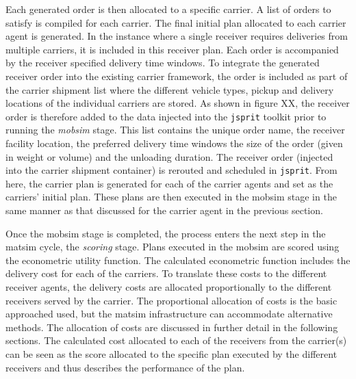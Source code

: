 Each generated order is then allocated to a specific carrier. A list of orders to satisfy is compiled for each carrier. The final initial plan allocated to each carrier agent is generated. In the instance where a single receiver requires deliveries from multiple carriers, it is included in this receiver plan. Each order is accompanied by the receiver specified delivery time windows. To integrate the generated receiver order into the existing carrier framework, the order is included as part of the carrier shipment list where the different vehicle types, pickup and delivery locations of the individual carriers are stored. As shown in figure XX, the receiver order is therefore added to the data injected into the \texttt{jsprit} toolkit prior to running the \textit{mobsim} stage. This list contains the unique order name, the receiver facility location, the preferred delivery time windows the size of the order (given in weight or volume) and the unloading duration. The receiver order (injected into the carrier shipment container) is rerouted and scheduled in \texttt{jsprit}. From here, the carrier plan is generated for each of the carrier agents and set as the carriers' initial plan. These plans are then executed in the mobsim stage in the same manner as that discussed for the carrier agent in the previous section. \par

Once the mobsim stage is completed, the process enters the next step in the \acrshort{matsim} cycle, the \textit{scoring} stage. Plans executed in the mobsim are scored using the econometric utility function. The calculated econometric function includes the delivery cost for each of the carriers. To translate these costs to the different receiver agents, the delivery costs are allocated proportionally to the different receivers served by the carrier. The proportional allocation of costs is the basic approached used, but the \acrshort{matsim} infrastructure can accommodate alternative methods. The allocation of costs are discussed in further detail in the following sections. The calculated cost allocated to each of the receivers from the carrier(s) can be seen as the score allocated to the specific plan executed by the different receivers and thus describes the performance of the plan. \par

